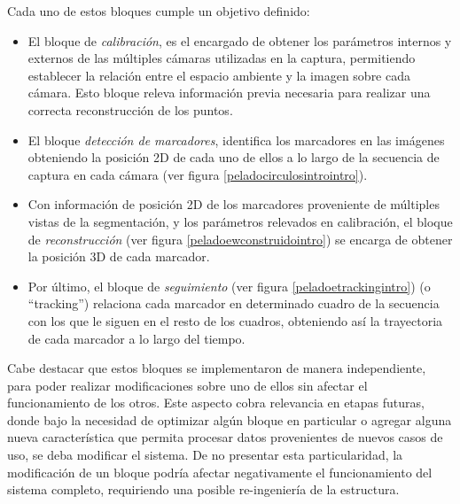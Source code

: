 Cada uno de estos bloques cumple un objetivo definido:
\begin{itemize}
\item El bloque de \emph{calibración}, es el encargado de obtener los parámetros internos y externos de las múltiples cámaras utilizadas en la captura, permitiendo establecer la relación entre el espacio ambiente y la imagen sobre cada cámara. Esto bloque releva información previa necesaria para realizar una correcta reconstrucción de los puntos.
\item El bloque \emph{detección de marcadores}, identifica los marcadores en las imágenes obteniendo la posición 2D de cada uno de ellos a lo largo de la secuencia de captura en cada cámara (ver figura \ref{peladocirculosintrointro}).
\item Con información de posición 2D de los marcadores proveniente de múltiples vistas de la segmentación, y los parámetros relevados en calibración, el bloque de \emph{reconstrucción} (ver figura \ref{peladoewconstruidointro}) se encarga de obtener la posición 3D de cada marcador.
\item Por último, el bloque de \emph{seguimiento} (ver figura \ref{peladoetrackingintro})
(o ``tracking'') relaciona cada marcador en determinado cuadro de la secuencia con los que le siguen en el resto de los cuadros, obteniendo así la trayectoria de cada marcador a lo largo del tiempo.
\end{itemize}

Cabe destacar que estos bloques se implementaron de manera independiente, para poder realizar modificaciones sobre uno de ellos sin afectar el funcionamiento de los otros. Este aspecto cobra relevancia en etapas futuras, donde bajo la necesidad de optimizar algún bloque en particular o agregar alguna nueva característica que permita procesar datos provenientes de nuevos casos de uso, se deba modificar el sistema. De no presentar esta particularidad, la modificación de un bloque podría afectar negativamente el funcionamiento del sistema completo, requiriendo una posible re-ingeniería de la estructura.

